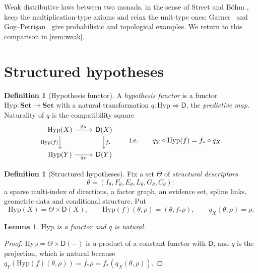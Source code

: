 \documentclass[11pt]{article}
\newtheorem{lemma}[theorem]{Lemma}
\theoremstyle{definition}
\newtheorem{definition}[theorem]{Definition}
\theoremstyle{remark}
\newcommand{\D}{\mathsf{D}}
\newcommand{\Set}{\mathbf{Set}}
\newcommand{\Hyp}{\mathrm{Hyp}}
\begin{document}
Weak distributive laws between two monads, in the sense of Street and B\"ohm
\cite{Street2009,Bohm2010,BohmLackStreet2011}, keep the multiplication-type axioms and relax the
unit-type ones; Garner~\cite{Garner2020} and Goy--Petri\c{s}an~\cite{GoyPetrisan2020} give
probabilistic and topological examples. We return to this comparison in \cref{rem:weak}.

\section{Structured hypotheses}\label{sec:hyp}

\begin{definition}[Hypothesis functor]\label{def:hypfunctor}
A \emph{hypothesis functor} is a functor $\Hyp\colon\Set\to\Set$ with a natural transformation
$q\colon\Hyp\Rightarrow\D$, the \emph{predictive map}. Naturality of $q$ is the compatibility square
\[
\begin{tikzcd}
\Hyp(X) \arrow[r,"q_X"] \arrow[d,"\Hyp(f)"'] & \D(X) \arrow[d,"f_*"]\\
\Hyp(Y) \arrow[r,"q_Y"'] & \D(Y)
\end{tikzcd}
\qquad\text{i.e.}\qquad q_Y\circ\Hyp(f)=f_*\circ q_X .
\]
\end{definition}

\begin{definition}[Structured hypotheses]\label{def:structured}
Fix a set $\Theta$ of \emph{structural descriptors}
\[\theta=(I_\theta,F_\theta,E_\theta,L_\theta,G_\theta,C_\theta):\]
a sparse multi-index of
directions, a factor graph, an evidence set, spline links, geometric data and conditional structure.
Put
\[
\Hyp(X)=\Theta\times\D(X),\qquad \Hyp(f)(\theta,\rho)=(\theta,f_*\rho),\qquad q_X(\theta,\rho)=\rho .
\]
\end{definition}

\begin{lemma}\label{lem:hyp-functor}
$\Hyp$ is a functor and $q$ is natural.
\end{lemma}
\begin{proof}
$\Hyp=\Theta\times\D(-)$ is a product of a constant functor with $\D$, and $q$ is the projection,
which is natural because $q_Y(\Hyp(f)(\theta,\rho))=f_*\rho=f_*(q_X(\theta,\rho))$.
\end{proof}
\end{document}

